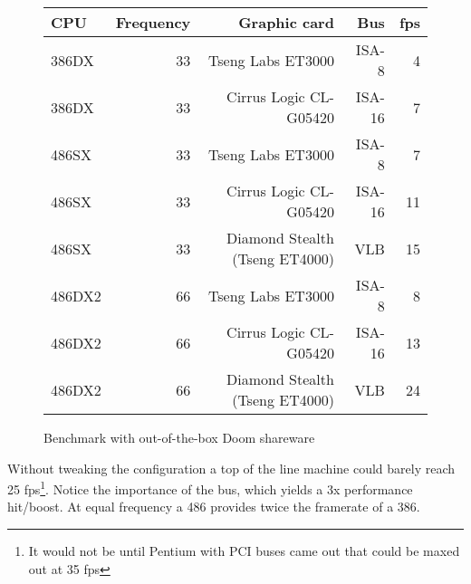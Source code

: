 \begin{figure}[H]
\centering  
\begin{tabularx}{\textwidth}{ L{1}  R{0.3} R{2.4} R{1} R{0.3} }
  \toprule
   \textbf{CPU} & \textbf{Frequency} & \textbf{Graphic card} & \textbf{Bus} & \textbf{fps}\\
  \toprule 
  386DX & 33 & Tseng Labs ET3000    & ISA-8  &  4\\
  386DX & 33 & Cirrus Logic CL-G05420 & ISA-16 &  7\\
  \toprule 
  486SX & 33 & Tseng Labs ET3000                & ISA-8  &  7\\
  486SX & 33 & Cirrus Logic CL-G05420           & ISA-16 & 11\\ 
  486SX & 33 & Diamond Stealth (Tseng ET4000)   & VLB    & 15\\
  \toprule 
  486DX2 & 66 & Tseng Labs ET3000               & ISA-8  &  8\\
  486DX2 & 66 & Cirrus Logic CL-G05420          & ISA-16 & 13\\
  486DX2 & 66 & Diamond Stealth (Tseng ET4000)  & VLB    & 24\\
   \toprule
 \end{tabularx}
\caption{Benchmark with out-of-the-box Doom shareware}
\end{figure}
\par
Without tweaking the configuration a top of the line machine could barely reach 25 fps\footnote{It would not be until Pentium with PCI buses came out that \doom could be maxed out at 35 fps}. Notice the importance of the bus, which yields a 3x performance hit/boost. At equal frequency a 486 provides twice the framerate of a 386.\\
\par






